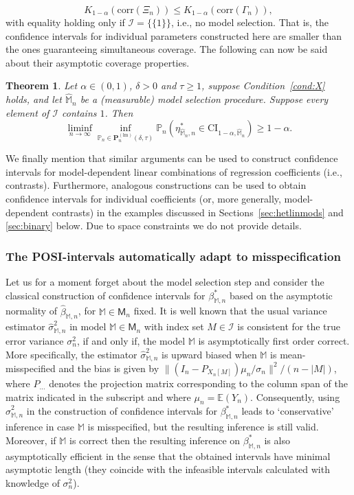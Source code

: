 \documentclass[preprint]{imsart}
\newcommand{\E}{{\mathbb E}}
\newcommand{\M}{\mathbb M}
\newtheorem{theorem}{Theorem}[section]
\numberwithin{equation}{section}
\begin{document}
$$K_{1-\alpha}(\mathrm{corr}(\Xi_n)) \leq K_{1-\alpha}(\mathrm{corr}(\Gamma_n)),$$  
with equality holding only if $\mathcal{I} = \{\{1\}\}$, i.e., no model selection. That is, the confidence intervals for individual parameters constructed here are smaller than the ones guaranteeing simultaneous coverage. The following can now be said about their asymptotic coverage properties.
%
\begin{theorem}\label{thm:homlinmodsindi}
Let $\alpha \in (0, 1)$, $\delta > 0$ and $\tau \ge 1$, suppose Condition~\ref{cond:X} holds, and let $\hat{\mathbb{M}}_n$ be a (measurable) model selection procedure. Suppose every element of $\mathcal{I}$ contains $1$. Then
%
\begin{equation*}
\liminf_{n \to \infty} 
\inf_{\mathbb{P}_n \in \mathbf{P}_n^{(\mathrm{lm})} \left(\delta, \tau \right)} \mathbb{P}_n \left(\eta^*_{\hat{\mathbb{M}}_n, n} \in  \mathrm{CI}_{1-\alpha, \hat{\mathbb{M}}_n} \right) \geq 1-\alpha.
\end{equation*}
%
\end{theorem}

We finally mention that similar arguments can be used to construct confidence intervals for model-dependent linear combinations of regression coefficients (i.e., contrasts). Furthermore, analogous constructions can be used to obtain confidence intervals for individual coefficients (or, more generally, model-dependent contrasts) in the examples discussed in Sections~\ref{sec:hetlinmods} and \ref{sec:binary} below. Due to space constraints we do not provide details.

\subsubsection{The POSI-intervals automatically adapt to misspecification}
\label{sec:homlinmods:varest}

Let us for a moment forget about the model selection step and consider the classical construction of confidence intervals for $\beta_{\M,n}^*$ based on the asymptotic normality of $\hat{\beta}_{\M,n}$, for $\M\in\mathsf{M}_n$ fixed. 
It is well known that the usual variance estimator $\hat{\sigma}_{\M,n}^2$ in model $\M\in\mathsf{M}_n$ with index set $M\in\mathcal I$ is consistent for the true error variance $\sigma_n^2$, if and only if, the model $\M$ is asymptotically first order correct. More specifically, the estimator $\hat{\sigma}_{\M,n}^2$ is upward biased when $\M$ is mean-misspecified and the bias is given by $\|(I_n - P_{X_n[M]})\mu_n/\sigma_n\|^2/(n-|M|)$, where $P_{\dots}$ denotes the projection matrix corresponding to the column span of the matrix indicated in the subscript and where $\mu_n = \E(Y_n)$. Consequently, using $\hat{\sigma}_{\M,n}^2$ in the construction of confidence intervals for $\beta_{\M,n}^*$ leads to `conservative' inference in case $\M$ is misspecified, but the resulting inference is still valid. Moreover, if $\M$ is correct then the resulting inference on $\beta_{\M,n}^*$ is also asymptotically efficient in the sense that the obtained intervals have minimal asymptotic length (they coincide with the infeasible intervals calculated with knowledge of $\sigma_n^2$). 
\end{document}
